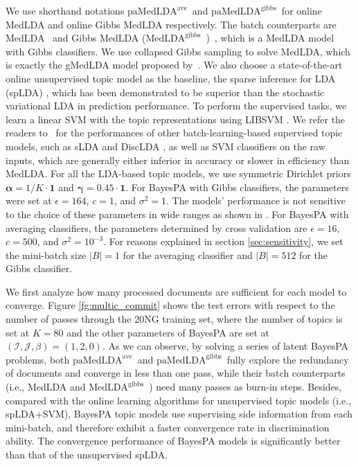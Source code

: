 \documentclass[twoside,11pt]{article}
\newcommand\paMedLDAave{$\text{paMedLDA}^{\text{ave}}$~}
\newcommand\paMedLDAgibbs{$\text{paMedLDA}^{\text{gibbs}}$~}
\newcommand\MedLDAgibbs{$\text{MedLDA}^{\text{gibbs}}$~}
\begin{document}
We use shorthand notations \paMedLDAave and \paMedLDAgibbs for online MedLDA and online Gibbs MedLDA respectively. The batch counterparts are MedLDA~\citep{zhu2012medlda} and Gibbs MedLDA (\MedLDAgibbs)~\citep{zhugibbs2013}, which is a MedLDA model with Gibbs classifiers. We use collapsed Gibbs sampling to solve MedLDA, which is exactly the gMedLDA model proposed by~\cite{jiang2012monte}. We also choose a state-of-the-art online unsupervised topic model as the baseline, the sparse inference for LDA (spLDA) \citep{mimno2012sparse}, which has been demonstrated to be superior than the stochastic variational LDA \citep{hoffman2013stochastic} in prediction performance. To perform the supervised tasks, we learn a linear SVM with the topic representations using LIBSVM \citep{chang2011libsvm}. We refer the readers to~\citep{zhu2012medlda} for the performances of other batch-learning-based supervised topic models, such as sLDA \citep{blei2010supervised} and DiscLDA \citep{lacoste2008disclda}, as well as SVM classifiers on the raw inputs, which are generally either inferior in accuracy or slower in efficiency than MedLDA. For all the LDA-based topic models, we use symmetric Dirichlet priors $\bm{\alpha} = 1/K \cdot \bm{1}$ and $\bm{\gamma} = 0.45 \cdot \bm{1}$. For BayesPA with Gibbs classifiers, the parameters were set at $\epsilon = 164$, $c = 1$, and $\sigma^2 = 1$. The models' performance is not sensitive to the choice of these parameters in wide ranges as shown in \cite{zhugibbs2013}. For BayesPA with averaging classifiers, the parameters determined by cross validation are $\epsilon = 16$, $c = 500$, and $\sigma^2 = 10^{-3}$. For reasons explained in section \ref{sec:sensitivity}, we set the mini-batch size $|B| = 1$ for the averaging classifier and $|B| = 512$ for the Gibbs classifier.

We first analyze how many processed documents are sufficient for each model to converge. Figure \ref{fg:multic_commit} shows the test errors with respect to the number of passes through the 20NG training set, where the number of topics is set at $K = 80$ and the other parameters of BayesPA are set at $(\mathcal{I}, \mathcal{J}, \beta) = (1, 2, 0)$. As we can observe, by solving a series of latent BayesPA problems, both \paMedLDAave and \paMedLDAgibbs fully explore the redundancy of documents and converge in  less than one pass, while their batch counterparts (i.e., MedLDA and \MedLDAgibbs) need many passes as burn-in steps. Besides, compared with the online learning algorithms for unsupervised topic models (i.e., spLDA+SVM), BayesPA topic models use supervising side information from each mini-batch, and therefore exhibit a faster convergence rate in discrimination ability. The convergence performance of BayesPA models is significantly better than that of the unsupervised spLDA.
\end{document}
